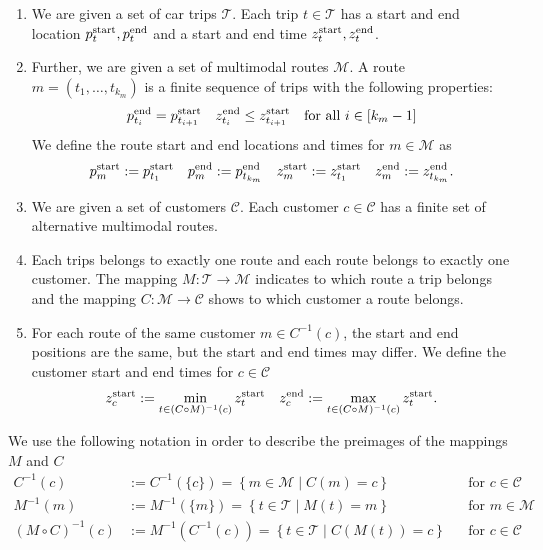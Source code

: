 \begin{definition}
\label{def:trips_routes_customers}

\begin{enumerate}
	\item
We are given a set of car trips $\mathcal{T}$. Each trip $t\in\mathcal{T}$ has a start and end location $p^{\operatorname{start}}_t, p^{\operatorname{end}}_t$ and a start and end time $z^{\operatorname{start}}_t, z^{\operatorname{end}}_t$.

	\item
Further, we are given a set of multimodal routes $\mathcal{M}$. A route ${m=\left(t_1,\dots,t_{k_m}\right)}$ is a finite sequence of trips with the following properties:
\begin{align*}
	p^{\operatorname{end}}_{t_i} = p^{\operatorname{start}}_{t_{i+1}} && z^{\operatorname{end}}_{t_i} \leq z^{\operatorname{start}}_{t_{i+1}} && \text{for all } i\in[k_m-1]
\end{align*}	
We define the route start and end locations and times for $m\in\mathcal{M}$ as
\begin{align*}
	p^{\operatorname{start}}_m := p^{\operatorname{start}}_{t_1} & &  p^{\operatorname{end}}_m := p^{\operatorname{end}}_{t_{k_m}} & & z^{\operatorname{start}}_m := z^{\operatorname{start}}_{t_1} & & z^{\operatorname{end}}_m := z^{\operatorname{end}}_{t_{k_m}}.
\end{align*}

	\item
We are given a set of customers $\mathcal{C}$. Each customer $c\in\mathcal{C}$ has a finite set of alternative multimodal routes.

	\item
Each trips belongs to exactly one route and each route belongs to exactly one customer. The mapping $M:\mathcal{T}\to\mathcal{M}$ indicates to which route a trip belongs and the mapping $C:\mathcal{M}\to\mathcal{C}$ shows to which customer a route belongs.	

	\item
For each route of the same customer $m\in C^{-1}(c)$, the start and end positions are the same, but the start and end times may differ. We define the customer start and end times for $c\in\mathcal{C}$
\begin{align*}
	z^{\operatorname{start}}_c := \min_{t\in (C\circ M)^{-1}(c)}z^{\operatorname{start}}_t & & z^{\operatorname{end}}_c := \max_{t\in (C\circ M)^{-1}(c)}z^{\operatorname{start}}_t .
\end{align*}
\end{enumerate}

\end{definition}

We use the following notation in order to describe the preimages of the mappings $M$ and $C$
\begin{align*}
	C^{-1}(c) & := C^{-1}\left(\{c\}\right) = \left\{m\in\mathcal{M}\mid C(m)=c\right\} && \text{for } c\in\mathcal{C} \\
	M^{-1}(m) & := M^{-1}\left(\{m\}\right) = \left\{t\in\mathcal{T}\mid M(t)=m\right\} && \text{for } m\in\mathcal{M} \\
	\left(M\circ C\right)^{-1}(c) & := M^{-1}\left(C^{-1}(c)\right) = \left\{t\in\mathcal{T}\mid C\left(M(t)\right)=c\right\} && \text{for } c\in\mathcal{C}
\end{align*}

